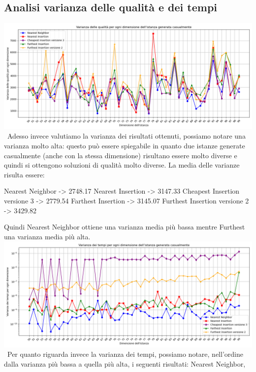 \documentclass[a4paper,12pt]{report}
\begin{document}
\subsection{Analisi varianza delle qualità e dei tempi}
\includegraphics[width=1\textwidth]{../Grafici/22.png} \
Adesso invece valutiamo la varianza dei risultati ottenuti, possiamo notare una varianza molto alta: questo può essere spiegabile in quanto due istanze generate casualmente (anche con la stessa dimensione) risultano essere molto diverse e quindi si ottengono soluzioni di qualità molto diverse. La media delle varianze risulta essere:
\begin{myverbatim}
Nearest Neighbor ->              2748.17
Nearest Insertion ->             3147.33
Cheapest Insertion versione 3 -> 2779.54
Farthest Insertion ->            3145.07
Furthest Insertion versione 2 -> 3429.82
\end{myverbatim}
Quindi Nearest Neighbor ottiene una varianza media più bassa mentre Furthest una varianza media più alta. \newline
\includegraphics[width=1\textwidth]{../Grafici/23.png} \
Per quanto riguarda invece la varianza dei tempi, possiamo notare, nell'ordine dalla varianza più bassa a quella più alta, i seguenti risultati: Nearest Neighbor, 
\end{document}
